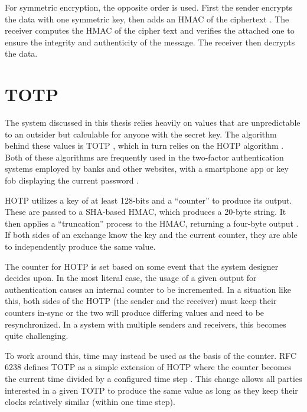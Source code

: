 \par For symmetric encryption, the opposite order is used. First the sender encrypts the data with one symmetric key, then adds an \ac{HMAC} of the ciphertext \cite{AuthEncrypt}. The receiver computes the \ac{HMAC} of the cipher text and verifies the attached one to ensure the integrity and authenticity of the message. The receiver then decrypts the data.

\section{\acf{TOTP}}
\label{sec:totp}
\par The system discussed in this thesis relies heavily on values that are unpredictable to an outsider but calculable for anyone with the secret key. The algorithm behind these values is \ac{TOTP} \cite{rfc6238}, which in turn relies on the \ac{HOTP} algorithm \cite{rfc4226}. Both of these algorithms are frequently used in the two-factor authentication systems employed by banks and other websites, with a smartphone app or key fob displaying the current password \cite{TwoFactorPhones}.

\par \ac{HOTP} utilizes a key of at least 128-bits and a ``counter'' to produce its output. These are passed to a \ac{SHA}-based \ac{HMAC}, which produces a 20-byte string. It then applies a ``truncation'' process to the \ac{HMAC}, returning a four-byte output \cite{rfc4226}. If both sides of an exchange know the key and the current counter, they are able to independently produce the same value.

\par The counter for \ac{HOTP} is set based on some event that the system designer decides upon. In the most literal case, the usage of a given output for authentication causes an internal counter to be incremented. In a situation like this, both sides of the HOTP (the sender and the receiver) must keep their counters in-sync or the two will produce differing values and need to be resynchronized. In a system with multiple senders and receivers, this becomes quite challenging.

\par To work around this, time may instead be used as the basis of the counter. RFC 6238 defines \ac{TOTP} as a simple extension of \ac{HOTP} where the counter becomes the current time divided by a configured time step \cite{rfc6238}. This change allows all parties interested in a given \ac{TOTP} to produce the same value as long as they keep their clocks relatively similar (within one time step). 

